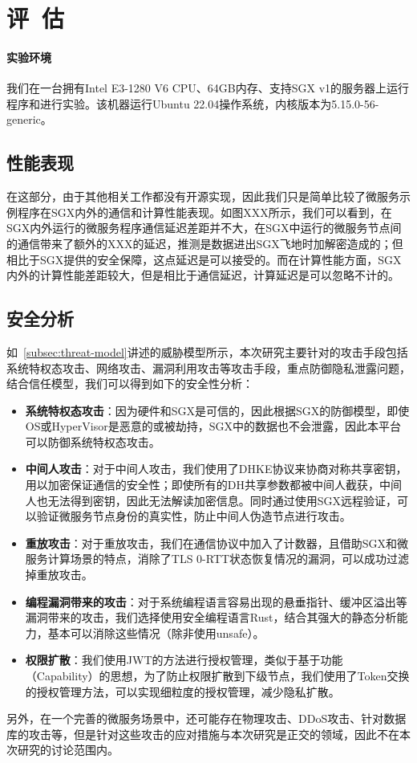 \section{评\ 估}\label{sec:evaluation}

\paragraph{实验环境}

我们在一台拥有Intel E3-1280 V6 CPU、64GB内存、支持SGX v1的服务器上运行程序和进行实验。该机器运行Ubuntu 22.04操作系统，内核版本为5.15.0-56-generic。

\subsection{性能表现}

在这部分，由于其他相关工作都没有开源实现，因此我们只是简单比较了微服务示例程序在SGX内外的通信和计算性能表现。如图XXX所示，我们可以看到，在SGX内外运行的微服务程序通信延迟差距并不大，在SGX中运行的微服务节点间的通信带来了额外的XXX的延迟，推测是数据进出SGX飞地时加解密造成的；但相比于SGX提供的安全保障，这点延迟是可以接受的。而在计算性能方面，SGX内外的计算性能差距较大，但是相比于通信延迟，计算延迟是可以忽略不计的。


\subsection{安全分析}

如~\cref{subsec:threat-model}讲述的威胁模型所示，本次研究主要针对的攻击手段包括系统特权态攻击、网络攻击、漏洞利用攻击等攻击手段，重点防御隐私泄露问题，结合信任模型，我们可以得到如下的安全性分析：

\begin{itemize}
    \item \textbf{系统特权态攻击}：因为硬件和SGX是可信的，因此根据SGX的防御模型，即使OS或HyperVisor是恶意的或被劫持，SGX中的数据也不会泄露，因此本平台可以防御系统特权态攻击。
    \item \textbf{中间人攻击}：对于中间人攻击，我们使用了DHKE协议来协商对称共享密钥，用以加密保证通信的安全性；即使所有的DH共享参数都被中间人截获，中间人也无法得到密钥，因此无法解读加密信息。同时通过使用SGX远程验证，可以验证微服务节点身份的真实性，防止中间人伪造节点进行攻击。
    \item \textbf{重放攻击}：对于重放攻击，我们在通信协议中加入了计数器，且借助SGX和微服务计算场景的特点，消除了TLS 0-RTT状态恢复情况的漏洞，可以成功过滤掉重放攻击。
    \item \textbf{编程漏洞带来的攻击}：对于系统编程语言容易出现的悬垂指针、缓冲区溢出等漏洞带来的攻击，我们选择使用安全编程语言Rust，结合其强大的静态分析能力，基本可以消除这些情况（除非使用unsafe）。
    \item \textbf{权限扩散}：我们使用JWT的方法进行授权管理，类似于基于功能（Capability）的思想，为了防止权限扩散到下级节点，我们使用了Token交换的授权管理方法，可以实现细粒度的授权管理，减少隐私扩散。
\end{itemize}

另外，在一个完善的微服务场景中，还可能存在物理攻击、DDoS攻击、针对数据库的攻击等，但是针对这些攻击的应对措施与本次研究是正交的领域，因此不在本次研究的讨论范围内。
